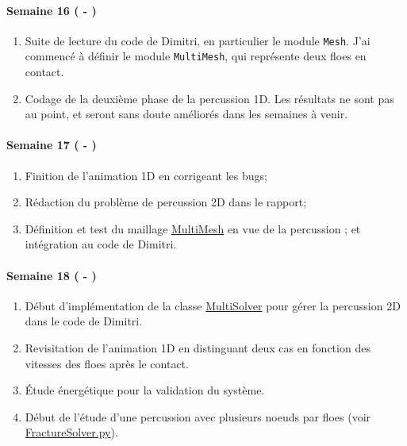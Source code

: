\paragraph{Semaine 16 ( - )} 
\begin{enumerate}
    \item Suite de lecture du code de Dimitri, en particulier le module \texttt{Mesh}. J'ai commencé à définir le module \texttt{MultiMesh}, qui représente deux floes en contact. 
    \item Codage de la deuxième phase de la percussion 1D. Les résultats ne sont pas au point, et seront sans doute améliorés dans les semaines à venir.
\end{enumerate}
  

\paragraph{Semaine 17 ( - )} 
\begin{enumerate}
    \item Finition de l'animation 1D en corrigeant les bugs;
    \item Rédaction du problème de percussion 2D dans le rapport;
    \item Définition et test du maillage \href{https://framagit.org/RaK/SimuRessorts/-/blob/master/springslattice/multimesh.py}{MultiMesh} en vue de la percussion ; et intégration au code de Dimitri.
\end{enumerate}
  

\paragraph{Semaine 18 ( - )} 
\begin{enumerate}
    \item Début d'implémentation de la classe \href{https://framagit.org/RaK/SimuRessorts/-/blob/master/springslattice/multisolver.py}{MultiSolver} pour gérer la percussion 2D dans le code de Dimitri.
    \item Revisitation de l'animation 1D en distinguant deux cas en fonction des vitesses des floes après le contact.
    \item Étude énergétique pour la validation du système.
    \item Début de l'étude d'une percussion avec plusieurs noeuds par floes (voir \href{https://github.com/desmond-rn/ice-floes/blob/master/code/simu1D/FractureSolver.py}{FractureSolver.py}).
\end{enumerate}
  

